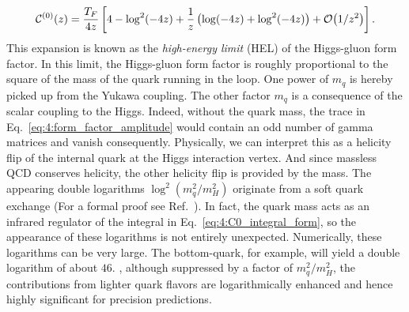 \begin{equation}
\mathcal{C}^{(0)}(z) = \frac{T_F}{4z} \left[ 4 - \log^2\!\left(-4 z \right) + \frac{1}{z} \left( \log\!\left(-4 z \right) + \log^2\!\left(-4 z \right) \right) + \mathcal{O}\!\left(1/z^2\right) \right].
\label{eq:4:C0_HEL}
\end{equation}
This expansion is known as the \textit{high-energy limit} (\acs{HEL}) of the Higgs-gluon form factor. In this limit, the Higgs-gluon form factor is roughly proportional to the square of the mass of the quark running in the loop. One power of $m_q$ is hereby picked up from the Yukawa coupling. The other factor $m_q$ is a consequence of the scalar coupling to the Higgs. Indeed, without the quark mass, the trace in Eq.~\eqref{eq:4:form_factor_amplitude} would contain an odd number of gamma matrices and vanish consequently. Physically, we can interpret this as a helicity flip of the internal quark at the Higgs interaction vertex. And since massless \acs{QCD} conserves helicity, the other helicity flip is provided by the mass. The appearing double logarithms $\log^2 (m_q^2/m_H^2)$ originate from a soft quark exchange (For a formal proof see Ref.~\cite{Liu:2017vkm}). In fact, the quark mass acts as an infrared regulator of the integral in Eq.~\ref{eq:4:C0_integral_form}, so the appearance of these logarithms is not entirely unexpected. Numerically, these logarithms can be very large. The bottom-quark, for example, will yield a double logarithm of about $46$. \Ie, although suppressed by a factor of $m_q^2/m_H^2$, the contributions from lighter quark flavors are logarithmically enhanced and hence highly significant for precision predictions.

